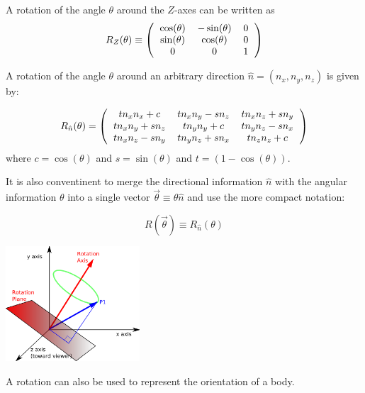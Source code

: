 \documentclass[12pt]{article}
\begin{document}
A rotation of the angle $\theta$ around the $Z$-axes can be written as
\begin{equation}
R_Z(\theta) \equiv \left(\begin{tabular}{ccc}
$\cos(\theta)$ & $-\sin(\theta)$ & 0 \\
$\sin(\theta)$ & $\cos(\theta)$ & 0 \\
0 & 0 & 1
\end{tabular}\right)
\end{equation}

A rotation of the angle $\theta$ around an arbitrary direction $\hat n = (n_x,n_y,n_z)$ is given by:

\begin{equation}
R_{\hat n}(\theta) = \left(\begin{tabular}{ccc} 
$t n_x n_x+c$ & $t n_x n_y-s n_z$ & $t n_x n_z+s n_y$ \\
$t n_x n_y+s n_z$ & $t n_y n_y+c$ & $t n_y n_z-s n_x$ \\
$t n_x n_z-s n_y$ & $t n_y n_z+s n_x$ & $t n_z n_z+c$
\end{tabular}\right)
\label{rotexpanded}
\end{equation}
where $c=\cos(\theta)$ and $s=\sin(\theta)$ and $t=(1-\cos(\theta))$.

It is also conventinent to merge the directional information $\hat n$ with the angular information $\theta$ into a single vector $\vec \theta \equiv \theta \hat n$ and use the more compact notation:

\begin{equation}
R(\vec \theta) \equiv R_{\hat n}(\theta)
\end{equation}

\begin{center}
\includegraphics[width=5cm]{images/rotation.png}
\end{center}

A rotation can also be used to represent the orientation of a body.
\end{document}
